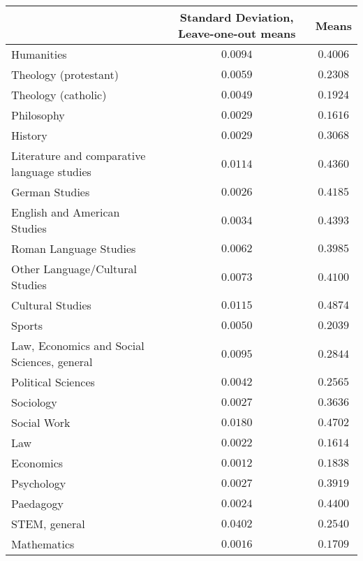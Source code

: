 
\begin{table}[h]
\begin{center}
\begin{tabular}{l c c}
\toprule
 & Standard Deviation, Leave-one-out means & Means \\
\midrule
Humanities                                  & $0.0094$ & $0.4006$ \\
Theology (protestant)                       & $0.0059$ & $0.2308$ \\
Theology (catholic)                         & $0.0049$ & $0.1924$ \\
Philosophy                                  & $0.0029$ & $0.1616$ \\
History                                     & $0.0029$ & $0.3068$ \\
Literature and comparative language studies & $0.0114$ & $0.4360$ \\
German Studies                              & $0.0026$ & $0.4185$ \\
English and American Studies                & $0.0034$ & $0.4393$ \\
Roman Language Studies                      & $0.0062$ & $0.3985$ \\
Other Language/Cultural Studies             & $0.0073$ & $0.4100$ \\
Cultural Studies                            & $0.0115$ & $0.4874$ \\
Sports                                      & $0.0050$ & $0.2039$ \\
Law, Economics and Social Sciences, general & $0.0095$ & $0.2844$ \\
Political Sciences                          & $0.0042$ & $0.2565$ \\
Sociology                                   & $0.0027$ & $0.3636$ \\
Social Work                                 & $0.0180$ & $0.4702$ \\
Law                                         & $0.0022$ & $0.1614$ \\
Economics                                   & $0.0012$ & $0.1838$ \\
Psychology                                  & $0.0027$ & $0.3919$ \\
Paedagogy                                   & $0.0024$ & $0.4400$ \\
STEM, general                               & $0.0402$ & $0.2540$ \\
Mathematics                                 & $0.0016$ & $0.1709$ \\

\end{tabular}
\end{center}
\end{table}
